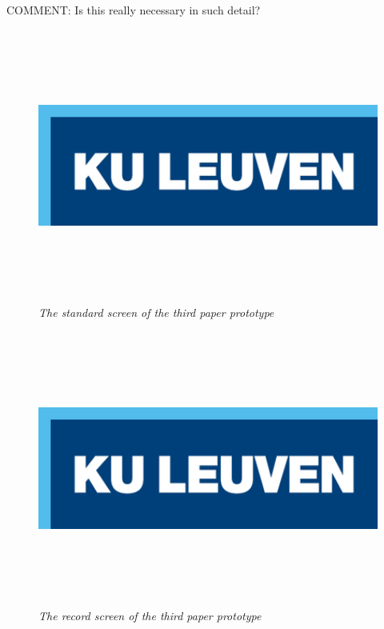 {\large COMMENT: Is this really necessary in such detail?}

\begin{figure}[H]
	\begin{center}
		\includegraphics[width=16cm, height=9cm]{KUL.png}
		\caption{\emph{The standard screen of the third paper prototype}}
		\label{The standard screen of the third paper prototype}
	\end{center}
\end{figure}

\begin{figure}[H]
	\begin{center}
		\includegraphics[width=16cm, height=9cm]{KUL.png}
		\caption{\emph{The record screen of the third paper prototype}}
		\label{The record screen of the third paper prototype}
	\end{center}
\end{figure}


